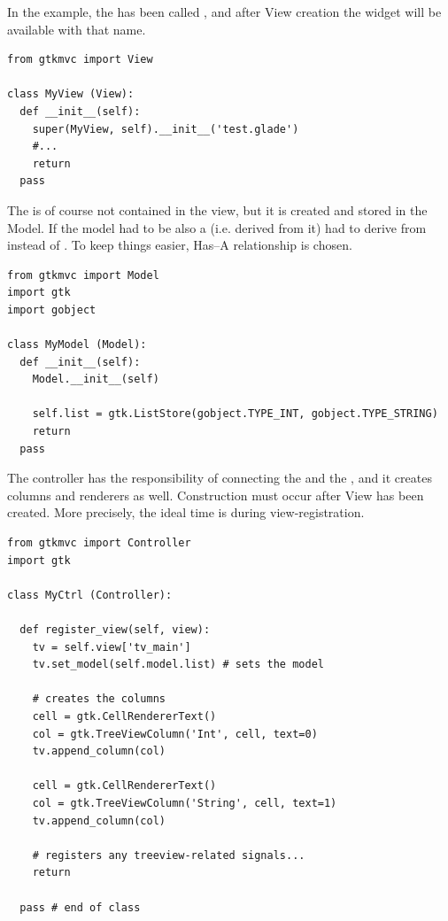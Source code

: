 In the example, the  has been called
, and after View creation the widget will be
available with that name.

{ \codesize 
\begin{verbatim}
from gtkmvc import View

class MyView (View):
  def __init__(self):
    super(MyView, self).__init__('test.glade')
    #...
    return
  pass 
\end{verbatim}
}

The  is of course not contained in the view, but
it is created and stored in the Model. If the model had to be also a
 (i.e.  derived from it)  had to
derive from  instead of
. To keep things easier, Has--A relationship is
chosen.

{ \codesize 
\begin{verbatim}
from gtkmvc import Model
import gtk
import gobject

class MyModel (Model):
  def __init__(self):
    Model.__init__(self)

    self.list = gtk.ListStore(gobject.TYPE_INT, gobject.TYPE_STRING)
    return
  pass 
\end{verbatim}
}

The controller has the responsibility of connecting the
 and the , and it creates
columns and renderers as well. Construction must occur after View has
been created. More precisely, the ideal time is during
view-registration.

{ \codesize 
\begin{verbatim}
from gtkmvc import Controller
import gtk

class MyCtrl (Controller):

  def register_view(self, view):
    tv = self.view['tv_main']    
    tv.set_model(self.model.list) # sets the model

    # creates the columns
    cell = gtk.CellRendererText()
    col = gtk.TreeViewColumn('Int', cell, text=0)
    tv.append_column(col)

    cell = gtk.CellRendererText()
    col = gtk.TreeViewColumn('String', cell, text=1)
    tv.append_column(col)

    # registers any treeview-related signals...
    return

  pass # end of class 
\end{verbatim}
}



